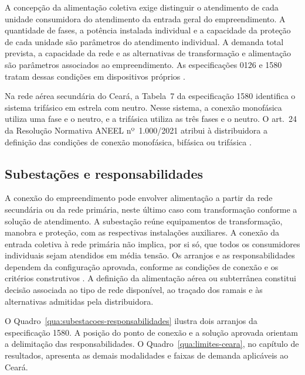 A concepção da alimentação coletiva exige distinguir o atendimento de cada unidade consumidora do atendimento da entrada geral do empreendimento. A quantidade de fases, a potência instalada individual e a capacidade da proteção de cada unidade são parâmetros do atendimento individual. A demanda total prevista, a capacidade da rede e as alternativas de transformação e alimentação são parâmetros associados ao empreendimento. As especificações 0126 e 1580 tratam dessas condições em dispositivos próprios \cite[seções~7.2, 7.3 e~7.5]{enel0126}\cite[itens~7.8.2, 7.8.3 e seção~7.11]{enel1580}.

Na rede aérea secundária do Ceará, a Tabela~7 da especificação 1580 identifica o sistema trifásico em estrela com neutro. Nesse sistema, a conexão monofásica utiliza uma fase e o neutro, e a trifásica utiliza as três fases e o neutro. O art.~24 da Resolução Normativa ANEEL nº~1.000/2021 atribui à distribuidora a definição das condições de conexão monofásica, bifásica ou trifásica \cite[art.~24]{aneel1000}\cite[seção~7.10, Tabela~7]{enel1580}.

\subsection{Subestações e responsabilidades}

A conexão do empreendimento pode envolver alimentação a partir da rede secundária ou da rede primária, neste último caso com transformação conforme a solução de atendimento. A subestação reúne equipamentos de transformação, manobra e proteção, com as respectivas instalações auxiliares. A conexão da entrada coletiva à rede primária não implica, por si só, que todos os consumidores individuais sejam atendidos em média tensão. Os arranjos e as responsabilidades dependem da configuração aprovada, conforme as condições de conexão e os critérios construtivos \cite[itens~7.1.18, 7.1.24 e seção~7.5]{enel0126}\cite[seções~7.8, 7.11 e~7.12]{enel1580}. A definição da alimentação aérea ou subterrânea constitui decisão associada ao tipo de rede disponível, ao traçado dos ramais e às alternativas admitidas pela distribuidora.

O Quadro~\ref{qua:subestacoes-responsabilidades} ilustra dois arranjos da especificação 1580. A posição do ponto de conexão e a solução aprovada orientam a delimitação das responsabilidades. O Quadro~\ref{qua:limites-ceara}, no capítulo de resultados, apresenta as demais modalidades e faixas de demanda aplicáveis ao Ceará.

